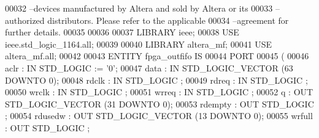 \begin{DoxyCode}
{00032 \textcolor{keyword}{--devices manufactured by Altera and sold by Altera or its }
00033 \textcolor{keyword}{--authorized distributors.  Please refer to the applicable }
00034 \textcolor{keyword}{--agreement for further details.}
00035 
00036 
00037 \textcolor{vhdlkeyword}{LIBRARY }\textcolor{keywordflow}{ieee};
00038 \textcolor{vhdlkeyword}{USE }ieee.std\_logic\_1164.\textcolor{keywordflow}{all};
00039 
00040 \textcolor{vhdlkeyword}{LIBRARY }\textcolor{keywordflow}{altera\_mf};
00041 \textcolor{vhdlkeyword}{USE }\textcolor{keywordflow}{altera\_mf.all};
00042 
00043 \textcolor{keywordflow}{ENTITY }fpga_outfifo \textcolor{keywordflow}{IS}
00044     \textcolor{keywordflow}{PORT}
00045     \textcolor{vhdlchar}{(}
00046         \textcolor{vhdlchar}{aclr}        \textcolor{vhdlchar}{:} \textcolor{keywordflow}{IN} \textcolor{comment}{STD\_LOGIC}  \textcolor{vhdlchar}{:=} \textcolor{vhdlchar}{'}\textcolor{vhdllogic}{}\textcolor{vhdllogic}{0}\textcolor{vhdlchar}{'};
00047         \textcolor{vhdlchar}{data}        \textcolor{vhdlchar}{:} \textcolor{keywordflow}{IN} \textcolor{comment}{STD\_LOGIC\_VECTOR} \textcolor{vhdlchar}{(}\textcolor{vhdllogic}{}\textcolor{vhdllogic}{63} \textcolor{keywordflow}{DOWNTO} \textcolor{vhdllogic}{}\textcolor{vhdllogic}{0}\textcolor{vhdlchar}{)};
00048         \textcolor{vhdlchar}{rdclk}       \textcolor{vhdlchar}{:} \textcolor{keywordflow}{IN} \textcolor{comment}{STD\_LOGIC} ;
00049         \textcolor{vhdlchar}{rdreq}       \textcolor{vhdlchar}{:} \textcolor{keywordflow}{IN} \textcolor{comment}{STD\_LOGIC} ;
00050         \textcolor{vhdlchar}{wrclk}       \textcolor{vhdlchar}{:} \textcolor{keywordflow}{IN} \textcolor{comment}{STD\_LOGIC} ;
00051         \textcolor{vhdlchar}{wrreq}       \textcolor{vhdlchar}{:} \textcolor{keywordflow}{IN} \textcolor{comment}{STD\_LOGIC} ;
00052         \textcolor{vhdlchar}{q}       \textcolor{vhdlchar}{:} \textcolor{keywordflow}{OUT} \textcolor{comment}{STD\_LOGIC\_VECTOR} \textcolor{vhdlchar}{(}\textcolor{vhdllogic}{}\textcolor{vhdllogic}{31} \textcolor{keywordflow}{DOWNTO} \textcolor{vhdllogic}{}\textcolor{vhdllogic}{0}\textcolor{vhdlchar}{)};
00053         \textcolor{vhdlchar}{rdempty}     \textcolor{vhdlchar}{:} \textcolor{keywordflow}{OUT} \textcolor{comment}{STD\_LOGIC} ;
00054         \textcolor{vhdlchar}{rdusedw}     \textcolor{vhdlchar}{:} \textcolor{keywordflow}{OUT} \textcolor{comment}{STD\_LOGIC\_VECTOR} \textcolor{vhdlchar}{(}\textcolor{vhdllogic}{}\textcolor{vhdllogic}{13} \textcolor{keywordflow}{DOWNTO} \textcolor{vhdllogic}{}\textcolor{vhdllogic}{0}\textcolor{vhdlchar}{)};
00055         \textcolor{vhdlchar}{wrfull}      \textcolor{vhdlchar}{:} \textcolor{keywordflow}{OUT} \textcolor{comment}{STD\_LOGIC} ;
}
\end{DoxyCode}
